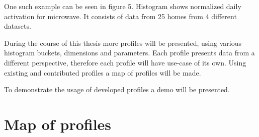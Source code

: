 \documentclass[
11pt, %
english, %
singlespacing, %
headsepline, %
]{MastersDoctoralThesis} %
\begin{document}
One such example can be seen in figure 5. Histogram shows normalized daily 
activation for microwave. It consists of data from 25 homes from 4 different
datasets. 

During the course of this thesis more profiles will be presented, using various histogram buckets, dimensions and parameters. 
Each profile presents data from a different perspective, therefore each profile will have use-case of its own.
Using existing and contributed profiles a map of profiles will be made. 

To demonstrate the usage of developed profiles a demo will be presented. 

\chapter{Map of profiles}







% 

\printbibliography[heading=bibintoc]
\end{document}
